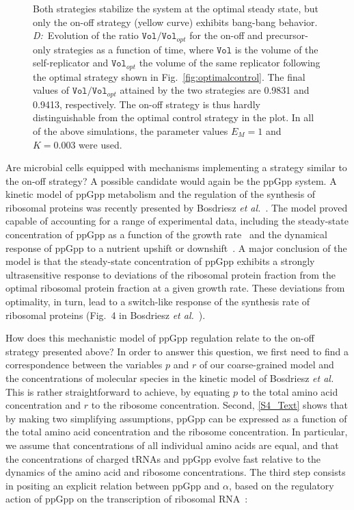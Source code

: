 \begin{figure}[p]
{Both strategies stabilize the system at the optimal steady state, but only the on-off strategy (yellow curve) exhibits bang-bang behavior.
\textit{D:}~Evolution of the ratio $\texttt{Vol} / \texttt{Vol}_{opt}$ for the on-off and precursor-only strategies as a function of time, where $\texttt{Vol}$ is the volume of the self-replicator and $\texttt{Vol}_{opt}$ the volume of the same replicator following the optimal strategy shown in Fig.~\ref{fig:optimalcontrol}.
The final values of $\texttt{Vol} / \texttt{Vol}_{opt}$ attained by the two strategies are 0.9831 and 0.9413, respectively.
The on-off strategy is thus hardly distinguishable from the optimal control strategy in the plot.
In all of the above simulations, the parameter values $E_M=1$ and $K=0.003$ were used.
}
\label{fig:onoffresults}
\end{figure}

Are microbial cells equipped with mechanisms implementing a strategy similar to the on-off strategy?
A possible candidate would again be the ppGpp system.
A kinetic model of ppGpp metabolism and the regulation of the synthesis of ribosomal proteins was recently presented by Bosdriesz \textit{et al.}~\cite{bosdriesz_how_2015}.
The model proved capable of accounting for a range of experimental data, including the steady-state concentration of ppGpp as a function of the growth rate~\cite{bremer_modulation_1996} and the dynamical response of ppGpp to a nutrient upshift or downshift~\cite{murray_control_2003}.
A major conclusion of the model is that the steady-state concentration of ppGpp exhibits a strongly ultrasensitive response to deviations of the ribosomal protein fraction from the optimal ribosomal protein fraction at a given growth rate. 
These deviations from optimality, in turn, lead to a switch-like response of the synthesis rate of ribosomal proteins (Fig.~4 in Bosdriesz \textit{et al.}~\cite{bosdriesz_how_2015}).

How does this mechanistic model of ppGpp regulation relate to the on-off strategy presented above?
In order to answer this question, we first need to find a correspondence between the variables $p$ and $r$ of our coarse-grained model and the concentrations of molecular species in the kinetic model of Bosdriesz \textit{et al.}
This is rather straightforward to achieve, by equating $p$ to the total amino acid concentration and $r$ to the ribosome concentration.
Second, \ref{S4_Text} shows that by making two simplifying assumptions, ppGpp can be expressed as a function of the total amino acid concentration and the ribosome concentration.
In particular, we assume that concentrations of all individual amino acids are equal, and that the concentrations of charged tRNAs and ppGpp evolve fast relative to the dynamics of the amino acid and ribosome concentrations.
The third step consists in positing an explicit relation between ppGpp and $\alpha$, based on the regulatory action of ppGpp on the transcription of ribosomal RNA~\cite{dennis_control_2004}:

